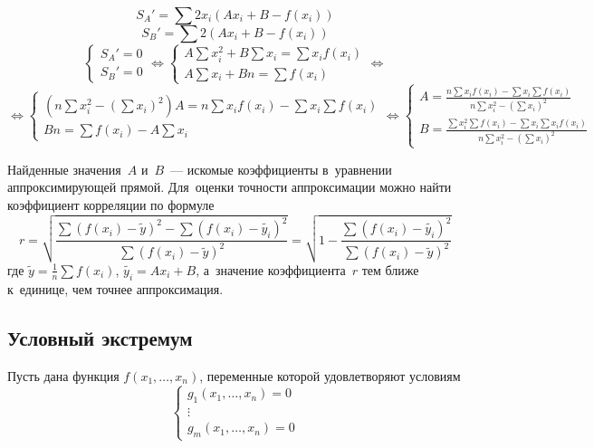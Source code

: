 \begin{equation*}
S_A' = \sum 2 x_i (A x_i + B - f(x_i))
\end{equation*}
\begin{equation*}
S_B' = \sum 2 (A x_i + B - f(x_i))
\end{equation*}
\begin{equation*}
\begin{cases}
\displaystyle S_A' = 0 \\
\displaystyle S_B' = 0
\end{cases}
\Leftrightarrow
\begin{cases}
\displaystyle A \sum x_i^2 + B \sum x_i = \sum x_i f(x_i) \\
\displaystyle A \sum x_i + Bn = \sum f(x_i)
\end{cases}
\Leftrightarrow
\end{equation*}
\begin{equation*}
\Leftrightarrow
\begin{cases}
\displaystyle \left(n \sum x_i^2 - \left(\sum x_i\right)^2\right)A = n \sum x_i f(x_i) - \sum x_i \sum f(x_i) \\
\displaystyle Bn = \sum f(x_i) - A \sum x_i
\end{cases}
\Leftrightarrow
\begin{cases}
\displaystyle A = \frac{\displaystyle n \sum x_i f(x_i) - \sum x_i \sum f(x_i)}{\displaystyle n \sum x_i^2 - \left(\sum x_i\right)^2} \\
\displaystyle B = \frac{\displaystyle \sum x_i^2 \sum f(x_i) - \sum x_i \sum x_i f(x_i)}{\displaystyle n \sum x_i^2 - \left(\sum x_i\right)^2}
\end{cases}
\end{equation*}
	
Найденные значения~$A$ и~$B$~--- искомые коэффициенты в~уравнении аппроксимирующей прямой.
Для~оценки точности аппроксимации можно найти коэффициент корреляции по формуле
\begin{equation*}
r = \sqrt{\frac
{\sum (f(x_i) - \tilde y)^2 - \sum (f(x_i) - \tilde{y_i})^2}
{\sum (f(x_i) - \tilde y)^2}} =
\sqrt{1 - \frac{\sum (f(x_i) - \tilde{y_i})^2}{\sum (f(x_i) - \tilde y)^2}}
\end{equation*}
где $\tilde y = \frac1n \sum f(x_i)$, $\tilde{y_i} = A x_i + B$, а~значение коэффициента~$r$ тем ближе к~единице, чем точнее аппроксимация.
	
\subsection{Условный экстремум}
Пусть дана функция $f(x_1, \ldots, x_n)$, переменные которой удовлетворяют условиям
\begin{equation*}
\begin{cases}
g_1(x_1, \ldots, x_n) = 0 \\
\vdots \\
g_m(x_1, \ldots, x_n) = 0
\end{cases}
\end{equation*}


